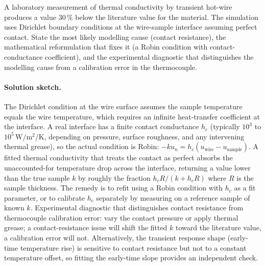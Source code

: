\begin{exercise}
A laboratory measurement of thermal conductivity by transient
hot-wire produces a value $30\,\%$ below the literature value
for the material. The simulation uses Dirichlet boundary
conditions at the wire-sample interface assuming perfect contact.
State the most likely modelling cause (contact resistance), the
mathematical reformulation that fixes it (a Robin condition with
contact-conductance coefficient), and the experimental
diagnostic that distinguishes the modelling cause from a
calibration error in the thermocouple.

\paragraph{Solution sketch.}
The Dirichlet condition at the wire surface assumes the sample
temperature equals the wire temperature, which requires an
infinite heat-transfer coefficient at the interface. A real
interface has a finite contact conductance $h_{c}$
(typically $10^{3}$ to $10^{5}\,\si{\watt\per\meter\squared\per
\kelvin}$, depending on pressure, surface roughness, and any
intervening thermal grease), so the actual condition is Robin:
$-k u_{n} = h_{c}(u_{\text{wire}} - u_{\text{sample}})$. A
fitted thermal conductivity that treats the contact as perfect
absorbs the unaccounted-for temperature drop across the
interface, returning a value lower than the true sample $k$ by
roughly the fraction $h_{c} R / (k + h_{c} R)$ where $R$ is the
sample thickness. The remedy is to refit using a Robin condition
with $h_{c}$ as a fit parameter, or to calibrate $h_{c}$
separately by measuring on a reference sample of known $k$.
Experimental diagnostic that distinguishes contact resistance
from thermocouple calibration error: vary the contact pressure
or apply thermal grease; a contact-resistance issue will shift
the fitted $k$ toward the literature value, a calibration error
will not. Alternatively, the transient response shape (early-
time temperature rise) is sensitive to contact resistance but
not to a constant temperature offset, so fitting the early-time
slope provides an independent check.
\end{exercise}

